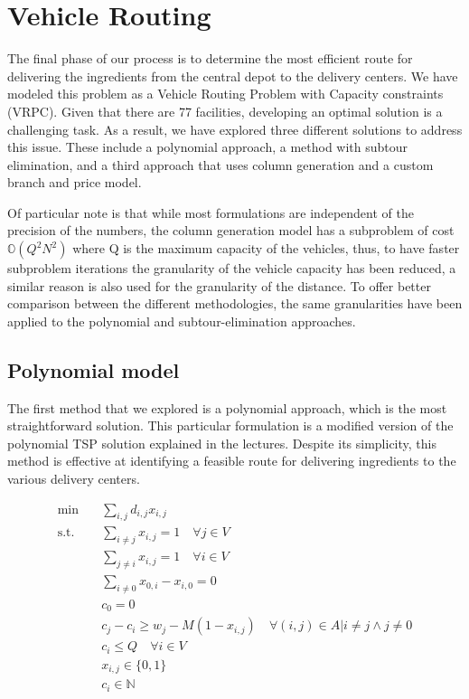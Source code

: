 \chapter{Vehicle Routing}
\label{vehicle-routing}
The final phase of our process is to determine the most efficient route for delivering the ingredients from the central depot to the delivery centers. We have modeled this problem as a Vehicle Routing Problem with Capacity constraints (VRPC). Given that there are 77 facilities, developing an optimal solution is a challenging task. As a result, we have explored three different solutions to address this issue. These include a polynomial approach, a method with subtour elimination, and a third approach that uses column generation and a custom branch and price model.

Of particular note is that while most formulations are independent of the precision of the numbers, the column generation model has a subproblem of cost $\mathbb{O}(Q^2N^2)$ where Q is the maximum capacity of the vehicles, thus, to have faster subproblem iterations the granularity of the vehicle capacity has been reduced, a similar reason is also used for the granularity of the distance. To offer better comparison between the different methodologies, the same granularities have been applied to the polynomial and subtour-elimination approaches.

\section{Polynomial model}
\label{polynomial-model}
The first method that we explored is a polynomial approach, which is the most straightforward solution. This particular formulation is a modified version of the polynomial TSP solution explained in the lectures. Despite its simplicity, this method is effective at identifying a feasible route for delivering ingredients to the various delivery centers.

\begin{align*}
    \min \quad & \sum_{i,j}{d_{i,j}x_{i,j}}\\
    \textrm{s.t.} \quad
      &\sum_{i \ne j} {x_{i,j}} = 1 \quad \forall j \in V \tag{1}\\
      &\sum_{j \ne i} {x_{i,j}} = 1 \quad \forall i \in V \tag{2}\\
      &\sum_{i \ne 0} {x_{0,i} - x_{i, 0}} = 0 \tag{3}\\
      &c_0 = 0 \tag{4}\\
      &c_j - c_i \geq w_j - M(1 - x_{i,j}) \quad \forall (i,j) \in A | i \ne j \land j \ne 0 \tag{5}\\
      &c_i \leq Q \quad \forall i \in V \tag{6}\\
      &x_{i,j} \in \{0,1\} \\
      &c_{i} \in \mathbb{N} \\
\end{align*}

